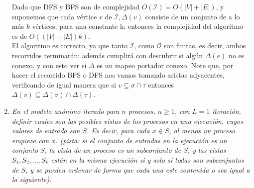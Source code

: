 \documentclass{article}
\begin{document}
\begin{enumerate}
{    Dado que DFS y BFS son de complejidad $O(\mathcal{I}) = O(|V| + |E|)$, y suponemos que cada vértice $v$ de $\mathcal{I},\Delta(v)$
    consiste de un conjunto de a lo más $k$ vértices, para una constante k; entonces la complejidad del algoritmo es de
    $O((|V| + |E|) k)$.\\
    El algoritmo es correcto, ya que tanto $\mathcal{I}$, como $\mathcal{O}$ son finitas, es decir, ambos recorridos terminarán; además
    cumplirá con descubrir si algún $\Delta(e)$ no es conexo, y con esto ver si $\Delta$ es un mapeo portador conexo. Note que, por
    hacer el recorrido BFS o DFS nos vamos tomando aristas adyacentes, verificando de igual manera que si $v\subseteq\sigma\cap\tau$ entonces
    $\Delta(v)\subseteq\Delta(\sigma)\cap\Delta(\tau)$.\\
  }

\item {
    \textsl{
      En el modelo anónimo iterado para $n$ procesos, $n ≥ 1$, con $L = 1$ iteración, definir
      cuales son las posibles vistas de los procesos en una ejecución, cuyos valores de entrada
      son $S$. Es decir, para cada $x \in S$, al menos un proceso empieza con $x$. (pista: si el
      conjunto de entradas en la ejecución es un conjunto $S$, la vista de un proceso es un 
      subconjunto de $S$, y las vistas $S_1,S_2,...,S_k$ están en la misma ejecución si y solo si
      todas son subconjuntos de $S$, y se pueden ordenar de forma que cada una este contenida o
      sea igual a la siguiente).\\
    }

}
\end{enumerate}
\end{document}
